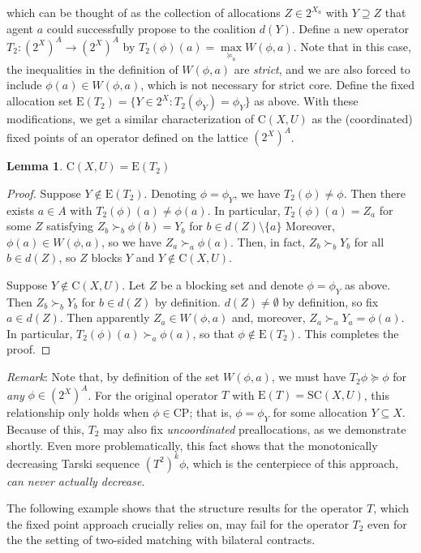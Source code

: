 \documentclass[11pt,reqno]{amsart}
\newtheorem{lemma}[thm]{Lemma}
\theoremstyle{definition}
\numberwithin{equation}{section}
\newcommand{\prf}{\begin{proof}}
\newcommand{\eprf}{\end{proof}}
\newcommand{\pre}{\phi}
\newcommand{\coordpre}{\mathrm{CP}}
\newcommand{\prealloc}{(2^X)^A}
\newcommand{\sub}{\subseteq}
\newcommand{\strcore}{\mathrm{SC}(X,U)}
\newcommand{\core}{\mathrm{C}(X,U)}
\newcommand{\fecon}{\mathrm{E}}
\newcommand{\suq}{\succeq}
\newcommand{\su}{\succ}
\newcommand{\optwo}{T_2}
\begin{document}
which can be thought of as the collection of allocations $Z \in 2^{X_a}$ with $Y \supseteq Z$ that agent $a$ could successfully propose to the coalition $d(Y)$.
Define a new operator $\optwo: \prealloc \to \prealloc$ by $\optwo (\pre) (a) = \max\limits_{\suq_a} W(\pre,a)$.
Note that in this case, the inequalities in the definition of $W(\pre,a)$ are \emph{strict}, and we are also forced to include $\pre(a) \in W(\pre,a)$, which is not necessary for strict core.
Define the fixed allocation set $\fecon(\optwo) = \{Y \in 2^X: \optwo(\pre_Y) = \pre_Y\}$ as above.
With these modifications, we get a similar characterization of $\core$ as the (coordinated) fixed points of an operator defined on the lattice $\prealloc$.
\begin{lemma} \label{lemma:core}
$\core = \fecon(\optwo)$
\end{lemma}
\prf
Suppose $Y \not \in \fecon(\optwo)$.
Denoting $\pre = \pre_Y$, we have $\optwo(\pre) \not = \pre$.
Then there exists $a \in A$ with $\optwo(\pre)(a) \not = \pre(a)$.
In particular, $\optwo(\pre)(a) = Z_a$ for some $Z$ satisfying $Z_b \su_b \pre(b) = Y_b$ for $b \in d(Z) \setminus \{a\}$
Moreover, $\pre(a) \in W(\pre,a)$, so we have $Z_a \su_a \pre(a)$.
Then, in fact, $Z_b \su_b Y_b$ for all $b \in d(Z)$, so $Z$ blocks $Y$ and $Y \not \in \core$.

Suppose $Y \not \in \core$. 
Let $Z$ be a blocking set and denote $\pre = \pre_Y$ as above.
Then $Z_b \su_b Y_b$ for $b \in d(Z)$ by definition.
$d(Z) \not = \emptyset$ by definition, so fix $a \in d(Z)$.
Then apparently $Z_a \in W(\pre,a)$ and, moreover, $Z_a \su_a Y_a = \pre(a)$.
In particular, $\optwo(\pre)(a) \su_a \pre(a)$, so that $\pre \not \in \fecon(\optwo)$.
This completes the proof.
\eprf

\emph{Remark}: Note that, by definition of the set $W(\pre,a)$, we must have $\optwo \pre \suq \pre$ for \emph{any} $\pre \in \prealloc$.
For the original operator $T$ with $\fecon(T) = \strcore$, this relationship only holds when $\pre \in \coordpre$; that is, $\pre = \pre_Y$ for some allocation $Y \sub X$.
Because of this, $\optwo$ may also fix \emph{uncoordinated} preallocations, as we demonstrate shortly.
Even more problematically, this fact shows that the monotonically decreasing Tarski sequence $(T^2)^k \pre$, which is the centerpiece of this approach, \emph{can never actually decrease}.

The following example shows that the structure results for the operator $T$, which the fixed point approach crucially relies on, may fail for the operator $\optwo$ even for the the setting of two-sided matching with bilateral contracts.
\end{document}
